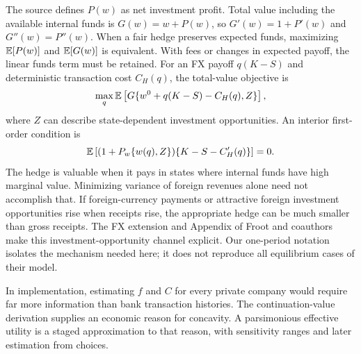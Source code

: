 The source defines $P(w)$ as net investment profit. Total value including the available internal funds is $G(w)=w+P(w)$, so $G'(w)=1+P'(w)$ and $G''(w)=P''(w)$. When a fair hedge preserves expected funds, maximizing $\mathbb E[P(w)]$ and $\mathbb E[G(w)]$ is equivalent. With fees or changes in expected payoff, the linear funds term must be retained. For an FX payoff $q(K-S)$ and deterministic transaction cost $C_H(q)$, the total-value objective is
\begin{equation}
\max_q\mathbb E\left[G\{w^0+q(K-S)-C_H(q),Z\}\right],
\end{equation}
where $Z$ can describe state-dependent investment opportunities. An interior first-order condition is
\begin{equation}
\mathbb E\left[(1+P_w\{w(q),Z\})\{K-S-C_H'(q)\}\right]=0.
\label{eq:froothedge}
\end{equation}
The hedge is valuable when it pays in states where internal funds have high marginal value. Minimizing variance of foreign revenues alone need not accomplish that. If foreign-currency payments or attractive foreign investment opportunities rise when receipts rise, the appropriate hedge can be much smaller than gross receipts. The FX extension and Appendix of Froot and coauthors make this investment-opportunity channel explicit. Our one-period notation isolates the mechanism needed here; it does not reproduce all equilibrium cases of their model.

In implementation, estimating $f$ and $C$ for every private company would require far more information than bank transaction histories. The continuation-value derivation supplies an economic reason for concavity. A parsimonious effective utility is a staged approximation to that reason, with sensitivity ranges and later estimation from choices.

